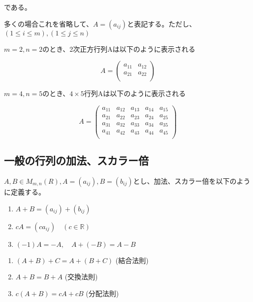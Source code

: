 \documentclass[dvipdfmx,autodetect-engine]{jsarticle}
\begin{document}
である。

多くの場合これを省略して、$A = (a_{ij})$と表記する。ただし、
$(1 \leq i \leq m), (1 \leq j \leq n)$


$m = 2, n = 2$のとき、2次正方行列Aは以下のように表示される

$$
A = \begin{pmatrix}
a_{11} & a_{12} \\
a_{21} & a_{22} \\
\end{pmatrix}
$$


$m = 4, n = 5$のとき、$4 \times 5$行列Aは以下のように表示される

$$
A = \begin{pmatrix}
a_{11} & a_{12} & a_{13} & a_{14} & a_{15} \\
a_{21} & a_{22} & a_{23} & a_{24} & a_{25} \\
a_{31} & a_{32} & a_{33} & a_{34} & a_{35} \\
a_{41} & a_{42} & a_{43} & a_{44} & a_{45} \\
\end{pmatrix}
$$

\subsection{一般の行列の加法、スカラー倍}\label{subsection:generalMatrixAdditionAndScalarMultiple}

\label{defi:additionAndScalarMultiple}

$A, B \in M_{m,n}(R), A = (a_{ij}), B = (b_{ij})$とし、加法、スカラー倍を以下のように定義する。

\begin{enumerate}
\renewcommand{\labelenumi}{(\arabic{enumi})}
\item $A + B = (a_{ij}) + (b_{ij})$
\item $cA = (ca_{ij}) \quad (c \in \mathbb{R})$
\item $(-1)A = -A, \quad A + (-B) = A - B$
\end{enumerate}


\begin{enumerate}
\renewcommand{\labelenumi}{(\arabic{enumi})}
\item $(A + B) + C = A + (B + C)$ \quad (結合法則)
\item $A + B = B + A$ \quad (交換法則)
\item $c(A+B) = cA + cB$ \quad (分配法則)
\end{enumerate}
\end{document}
